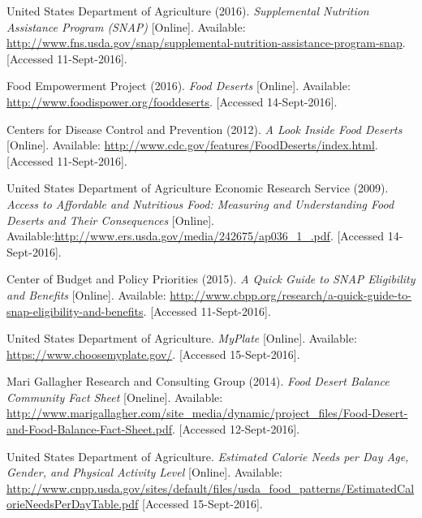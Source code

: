 \documentclass[11pt]{article}
\begin{document}
\pagebreak
\begin{thebibliography}{9}
    United States Department of Agriculture (2016).
    \textit{Supplemental Nutrition Assistance Program (SNAP)} [Online].
    Available: \url{http://www.fns.usda.gov/snap/supplemental-nutrition-assistance-program-snap}.
    [Accessed 11-Sept-2016].

    Food Empowerment Project (2016).
    \textit{Food Deserts} [Online].
    Available: \url{http://www.foodispower.org/fooddeserts}.
    [Accessed 14-Sept-2016].

    Centers for Disease Control and Prevention (2012).
    \textit{A Look Inside Food Deserts} [Online].
    Available: \url{http://www.cdc.gov/features/FoodDeserts/index.html}.
    [Accessed 11-Sept-2016].

    United States Department of Agriculture Economic Research Service (2009).
    \textit{Access to Affordable and Nutritious Food: Measuring and Understanding Food Deserts and
    Their Consequences} [Online].
    Available:\url{http://www.ers.usda.gov/media/242675/ap036_1_.pdf}.
    [Accessed 14-Sept-2016].

    Center of Budget and Policy Priorities (2015).
    \textit{A Quick Guide to SNAP Eligibility and Benefits} [Online].
    Available: \url{http://www.cbpp.org/research/a-quick-guide-to-snap-eligibility-and-benefits}.
    [Accessed 11-Sept-2016].

    United States Department of Agriculture.
    \textit{MyPlate} [Online].
    Available: \url{https://www.choosemyplate.gov/}.
    [Accessed 15-Sept-2016].

    Mari Gallagher Research and Consulting Group (2014).
    \textit{Food Desert Balance Community Fact Sheet} [Oneline].
    Available:
    \url{http://www.marigallagher.com/site_media/dynamic/project_files/Food-Desert-and-Food-Balance-Fact-Sheet.pdf}.
    [Accessed 12-Sept-2016].

    United States Department of Agriculture.
    \textit{Estimated Calorie Needs per Day Age, Gender, and Physical Activity Level} [Online].
    Available:
    \url{http://www.cnpp.usda.gov/sites/default/files/usda_food_patterns/EstimatedCalorieNeedsPerDayTable.pdf}
    [Accessed 15-Sept-2016].
\end{thebibliography}
\end{document}
